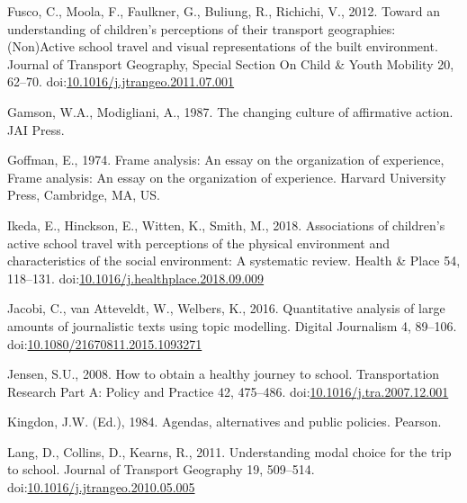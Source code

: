 \documentclass[]{elsarticle} %
\begin{document}
\leavevmode\hypertarget{ref-fuscoUnderstandingChildrenPerceptions2012}{}%
Fusco, C., Moola, F., Faulkner, G., Buliung, R., Richichi, V., 2012.
Toward an understanding of children's perceptions of their transport
geographies: (Non)Active school travel and visual representations of the
built environment. Journal of Transport Geography, Special Section On
Child \& Youth Mobility 20, 62--70.
doi:\href{https://doi.org/10.1016/j.jtrangeo.2011.07.001}{10.1016/j.jtrangeo.2011.07.001}

\leavevmode\hypertarget{ref-gamsonChangingCulture1987}{}%
Gamson, W.A., Modigliani, A., 1987. The changing culture of affirmative
action. JAI Press.

\leavevmode\hypertarget{ref-goffmanFrameAnalysisEssay1974}{}%
Goffman, E., 1974. Frame analysis: An essay on the organization of
experience, Frame analysis: An essay on the organization of experience.
Harvard University Press, Cambridge, MA, US.

\leavevmode\hypertarget{ref-ikedaAssociationsChildrenActive2018}{}%
Ikeda, E., Hinckson, E., Witten, K., Smith, M., 2018. Associations of
children's active school travel with perceptions of the physical
environment and characteristics of the social environment: A systematic
review. Health \& Place 54, 118--131.
doi:\href{https://doi.org/10.1016/j.healthplace.2018.09.009}{10.1016/j.healthplace.2018.09.009}

\leavevmode\hypertarget{ref-jacobiQuantitativeAnalysisLarge2016}{}%
Jacobi, C., van Atteveldt, W., Welbers, K., 2016. Quantitative analysis
of large amounts of journalistic texts using topic modelling. Digital
Journalism 4, 89--106.
doi:\href{https://doi.org/10.1080/21670811.2015.1093271}{10.1080/21670811.2015.1093271}

\leavevmode\hypertarget{ref-jensenHowObtainHealthy2008}{}%
Jensen, S.U., 2008. How to obtain a healthy journey to school.
Transportation Research Part A: Policy and Practice 42, 475--486.
doi:\href{https://doi.org/10.1016/j.tra.2007.12.001}{10.1016/j.tra.2007.12.001}

\leavevmode\hypertarget{ref-kingdonAgendasAlternativesPublic1984}{}%
Kingdon, J.W. (Ed.), 1984. Agendas, alternatives and public policies.
Pearson.

\leavevmode\hypertarget{ref-langUnderstandingModalChoice2011}{}%
Lang, D., Collins, D., Kearns, R., 2011. Understanding modal choice for
the trip to school. Journal of Transport Geography 19, 509--514.
doi:\href{https://doi.org/10.1016/j.jtrangeo.2010.05.005}{10.1016/j.jtrangeo.2010.05.005}
\end{document}
